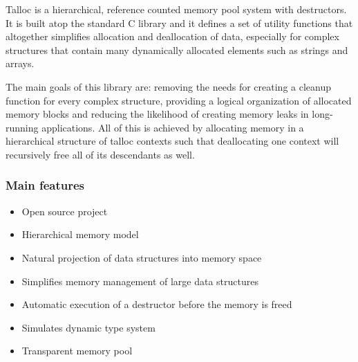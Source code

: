 Talloc is a hierarchical, reference counted memory pool system with destructors.
It is built atop the standard C library and it defines a set of utility
functions that altogether simplifies allocation and deallocation of data,
especially for complex structures that contain many dynamically allocated
elements such as strings and arrays.

The main goals of this library are: removing the needs for creating a cleanup
function for every complex structure, providing a logical organization of
allocated memory blocks and reducing the likelihood of creating memory leaks in
long-running applications. All of this is achieved by allocating memory in a
hierarchical structure of talloc contexts such that deallocating one context
will recursively free all of its descendants as well.

\subsubsection{Main features}
\begin{itemize}
  \item Open source project
  \item Hierarchical memory model
  \item Natural projection of data structures into memory space
  \item Simplifies memory management of large data structures
  \item Automatic execution of a destructor before the memory is freed
  \item Simulates dynamic type system
  \item Transparent memory pool
\end{itemize}
